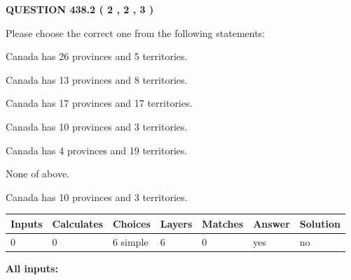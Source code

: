 \documentclass[12pt]{article}
\begin{document}
   
  
\vspace{0.2in}
  
{\textbf{\Large{QUESTION
438.2 
 ( 2 , 2 , 3 )
}}}
  
  
Please choose the correct one from the following statements:
 
 
Canada has  26 provinces and  5 territories.
 
 
Canada has  13 provinces and  8 territories.
 
 
Canada has  17 provinces and  17 territories.
 
 
Canada has 10  provinces and 3 territories.
 
 
Canada has   4 provinces and  19 territories.
 
 
 None of above.
 
 
\noindent{}
 
 
Canada has 10  provinces and 3 territories.
 
 
\noindent{}
 
 
   
   
   
   
\noindent\begin{tabular}{|l|l|l|l|l|l|l|}
 \hline
Inputs & Calculates & Choices & Layers & Matches & Answer & Solution \\ \hline
 0  & 
 0  & 
 6
  simple  
  & 
 6  & 
 0  & 
  yes & 
  no 
  \\ \hline
 \end{tabular}
   
   
   
   
\noindent{}
   
   
   
   
\noindent\vspace{0.1in}\hspace{-0.08in} {\textbf{\Large{All inputs: }}}
   
   
   
   
   
   
 \vspace{0.2in}
 
\end{document}
